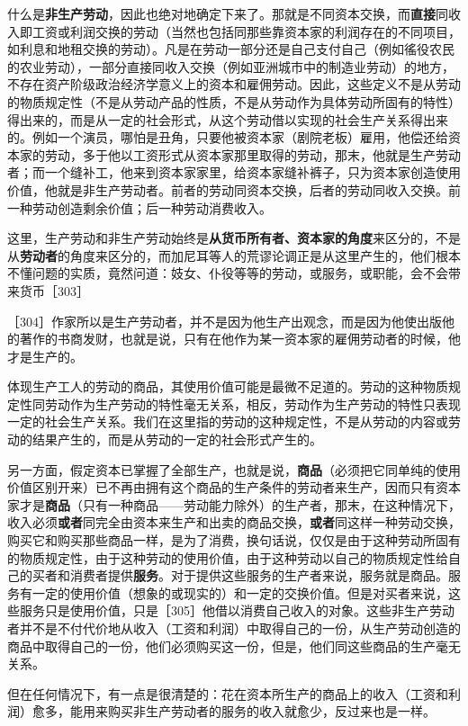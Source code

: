 什么是\textbf{非生产劳动}，因此也绝对地确定下来了。那就是不同资本交换，而\textbf{直接}同收入即工资或利润交换的劳动（当然也包括同那些靠资本家的利润存在的不同项目，如利息和地租交换的劳动）。凡是在劳动一部分还是自己支付自己（例如徭役农民的农业劳动），一部分直接同收入交换（例如亚洲城市中的制造业劳动）的地方，不存在资产阶级政治经济学意义上的资本和雇佣劳动。因此，这些定义不是从劳动的物质规定性（不是从劳动产品的性质，不是从劳动作为具体劳动所固有的特性）得出来的，而是从一定的社会形式，从这个劳动借以实现的社会生产关系得出来的。例如一个演员，哪怕是丑角，只要他被资本家（剧院老板）雇用，他偿还给资本家的劳动，多于他以工资形式从资本家那里取得的劳动，那末，他就是生产劳动者；而一个缝补工，他来到资本家家里，给资本家缝补裤子，只为资本家创造使用价值，他就是非生产劳动者。前者的劳动同资本交换，后者的劳动同收入交换。前一种劳动创造剩余价值；后一种劳动消费收入。

这里，生产劳动和非生产劳动始终是\textbf{从货币所有者、资本家的角度}来区分的，不是从\textbf{劳动者}的角度来区分的，而加尼耳等人的荒谬论调正是从这里产生的，他们根本不懂问题的实质，竟然问道：妓女、仆役等等的劳动，或服务，或职能，会不会带来货币［303］

［304］作家所以是生产劳动者，并不是因为他生产出观念，而是因为他使出版他的著作的书商发财，也就是说，只有在他作为某一资本家的雇佣劳动者的时候，他才是生产的。

体现生产工人的劳动的商品，其使用价值可能是最微不足道的。劳动的这种物质规定性同劳动作为生产劳动的特性毫无关系，相反，劳动作为生产劳动的特性只表现一定的社会生产关系。我们在这里指的劳动的这种规定性，不是从劳动的内容或劳动的结果产生的，而是从劳动的一定的社会形式产生的。

另一方面，假定资本已掌握了全部生产，也就是说，\textbf{商品}（必须把它同单纯的使用价值区别开来）已不再由拥有这个商品的生产条件的劳动者来生产，因而只有资本家才是\textbf{商品}（只有一种商品——劳动能力除外）的生产者，那末，在这种情况下，收入必须\textbf{或者}同完全由资本来生产和出卖的商品交换，\textbf{或者}同这样一种劳动交换，购买它和购买那些商品一样，是为了消费，换句话说，仅仅是由于这种劳动所固有的物质规定性，由于这种劳动的使用价值，由于这种劳动以自己的物质规定性给自己的买者和消费者提供\textbf{服务}。对于提供这些服务的生产者来说，服务就是商品。服务有一定的使用价值（想象的或现实的）和一定的交换价值。但是对买者来说，这些服务只是使用价值，只是［305］他借以消费自己收入的对象。这些非生产劳动者并不是不付代价地从收入（工资和利润）中取得自己的一份，从生产劳动创造的商品中取得自己的一份，他们必须购买这一份，但是，他们同这些商品的生产毫无关系。

但在任何情况下，有一点是很清楚的：花在资本所生产的商品上的收入（工资和利润）愈多，能用来购买非生产劳动者的服务的收入就愈少，反过来也是一样。

